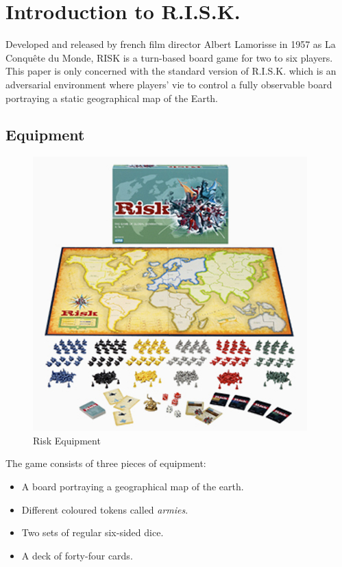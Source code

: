 \documentclass[parskip]{cs4rep}
\begin{document}
\newpage

\section{Introduction to R.I.S.K.}

Developed and released by french film director Albert Lamorisse in 1957 as La Conqu\^ete du Monde, RISK is a turn-based board game for two to six players. This paper is only concerned with the standard version of R.I.S.K. which is an adversarial environment where players' vie to control a fully observable board portraying a static geographical map of the Earth.

\subsection{Equipment}

\begin{figure}[h]
\centering
\includegraphics{images/risk-board}
\caption{Risk Equipment \cite{riskimage}}
\label{fig:risk-equipment}
\end{figure}

The game consists of three pieces of equipment:

\begin{itemize}
\item
A board portraying a geographical map of the earth.
\item
Different coloured tokens called \textit{armies}.
\item
Two sets of regular six-sided dice.
\item
A deck of forty-four cards.
\end{itemize}
\end{document}
